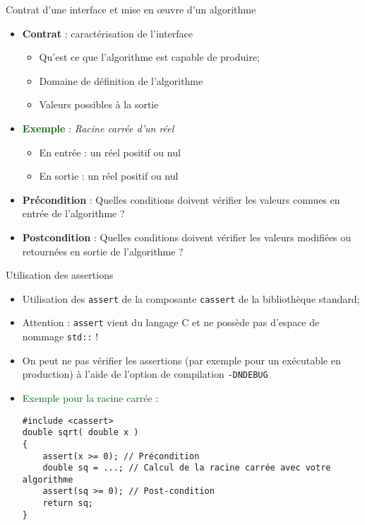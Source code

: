 \documentclass[compress,10pt,aspectratio=169]{beamer}
\begin{document}
\begin{frame}[fragile]{Contrat d'une interface et mise en {\oe}uvre d'un algorithme}
    \scriptsize 
    \begin{itemize}
        \item \textbf{Contrat} : caractérisation de l'interface
        \begin{itemize}
            \scriptsize
        \item Qu'est ce que l'algorithme est capable de produire;
        \item Domaine de définition de l'algorithme
        \item Valeurs possibles à la sortie
        \end{itemize}
        \item \textbf{\textcolor{DarkGreen}{Exemple}} : \textsl{Racine carrée d'un réel}
        \begin{itemize}
        \scriptsize 
        \item \textcolor{DarkYellow}{En entrée} : un réel positif ou nul 
        \item \textcolor{DarkYellow}{En sortie} : un réel positif ou nul
        \end{itemize}
        \item \textbf{Précondition} : Quelles conditions doivent vérifier les valeurs connues en entrée de l'algorithme ?
        \item \textbf{Postcondition} : Quelles conditions doivent vérifier les valeurs modifiées ou retournées en sortie de l'algorithme ?
    \end{itemize}
\end{frame}

\begin{frame}[fragile]{Utilisation des assertions}
\scriptsize 

\begin{itemize}
\item Utilisation des \texttt{assert} de la composante \texttt{cassert} de la bibliothèque standard;
\item \alert{Attention} : \texttt{assert} vient du langage C et ne possède pas d'espace de nommage \texttt{std::} !
\item On peut ne pas vérifier les assertions (par exemple pour un exécutable en production) à l'aide de l'option de compilation 
\texttt{-DNDEBUG}
\item \textcolor{DarkGreen}{Exemple pour la racine carrée} :
\begin{verbatim}
#include <cassert>
double sqrt( double x )
{
    assert(x >= 0); // Précondition
    double sq = ...; // Calcul de la racine carrée avec votre algorithme
    assert(sq >= 0); // Post-condition
    return sq;
}
\end{verbatim}
\end{itemize}
\end{frame}
\end{document}
